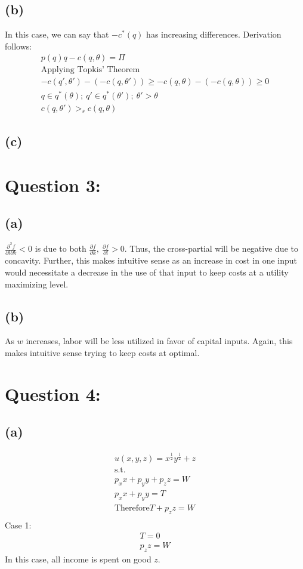 \documentclass[10pt, a4paper]{article}
\begin{document}
    \subsection*{(b)}
      In this case, we can say that $-c^*(q)$ has increasing differences. Derivation follows:
      \begin{gather*}
        p(q)q - c(q,\theta) = \Pi \\
        \text{Applying Topkis' Theorem} \\
        -c(q',\theta')-(-c(q,\theta')) \geq -c(q,\theta)-(-c(q,\theta)) \geq 0 \\
        q\in q^*(\theta); \ q'\in q^*(\theta'); \ \theta' > \theta \\
        c(q,\theta') >_s c(q,\theta)
      \end{gather*}
    \subsection*{(c)}
      
\section*{Question 3:}
    \subsection*{(a)}
      $\frac{\partial^2 f}{\partial l\partial k}<0$ is due to both $\frac{\partial f}{\partial k}, \ \frac{\partial f}{\partial l} >0$. Thus, the cross-partial will be negative due to concavity.
      Further, this makes intuitive sense as an increase in cost in one input would necessitate a decrease in the use of that input to keep costs at a utility maximizing level.
    
    \subsection*{(b)}
      As $w$ increases, labor will be less utilized in favor of capital inputs. Again, this makes intuitive sense trying to keep costs at optimal.

\section*{Question 4:}
    \subsection*{(a)}
      \begin{gather*}
        u(x,y,z) = x^{\frac{1}{2}}y^{\frac{1}{2}}+z \\
        \text{s.t.} \\
        p_xx + p_yy + p_zz = W \\
        p_xx +p_yy = T \\
        \text{Therefore} T+p_zz = W \\
      \end{gather*}
      Case 1:
      \begin{gather*}
        T = 0 \\
        p_zz = W
      \end{gather*}
      In this case, all income is spent on good $z$.
\end{document}
